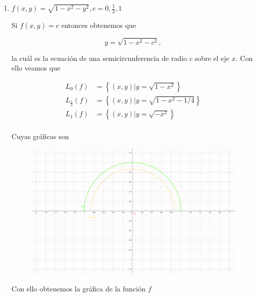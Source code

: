\documentclass[letterpaper]{article}
\theoremstyle{definition}
\theoremstyle{lemathm}
\theoremstyle{lemathm}
\theoremstyle{lemathm}
\theoremstyle{lemademthm}
\newcommand{\set}[1]{\left \{ #1 \right\} }
\newcommand{\1}{\mathbbm{1}}
\begin{document}
\begin{enumerate}
\begin{enumerate}
			\newpage

			\item $f(x,y)=\sqrt{1-x^2-y^2}, c=0,\frac{1}{2},1$
			
			Si $f(x,y)=c$ entonces obtenemos que

			\[y = \sqrt{1-x^2-c^2},\]

			la cuál es la ecuación de una semicircunferencia de radio $c$ sobre el eje $x$. Con ello veamos que

			\begin{align*}
				L_{0}(f) &= \set{(x,y) | y = \sqrt{1-x^2}}\\
				L_{\frac{1}{2}}(f) &= \set{(x,y) | y = \sqrt{1-x^2-1/4}}\\
				L_{1}(f) &= \set{(x,y) | y = \sqrt{-x^2}}\\
			\end{align*}

			Cuyas gráficas son

			\begin{figure}[h!]
				\includegraphics{Images/10.4.1.png}
				\centering
			\end{figure}

			Con ello obtenemos la gráfica de la función $f$


\end{enumerate}
\end{enumerate}
\end{document}
